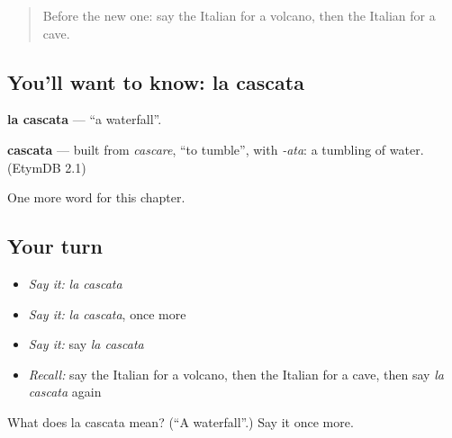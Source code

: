 \label{lesson:IT-C119-cascata}



\begin{quote}
Before the new one: say the Italian for a volcano, then the Italian for a cave.
\end{quote}

\subsection*{You'll want to know: la cascata}
\textbf{la cascata} — \textquotedblleft{}a waterfall\textquotedblright{}.

\begin{cousinweb}
\textbf{cascata} — built from \emph{cascare}, \textquotedblleft{}to tumble\textquotedblright{}, with \emph{-ata}: a tumbling of water. (EtymDB 2.1)
\end{cousinweb}

\begin{grammarlens}[title={What you've built}]
One more word for this chapter.
\end{grammarlens}

\subsection*{Your turn}
\begin{itemize}
\raggedright
  \item \emph{Say it:} \emph{la cascata}
  \item \emph{Say it:} \emph{la cascata}, once more
  \item \emph{Say it:} say \emph{la cascata}
  \item \emph{Recall:} say the Italian for a volcano, then the Italian for a cave, then say \emph{la cascata} again
\end{itemize}

\begin{tcolorbox}[breakable,colback=teal!4,colframe=teal!35!black,title={Before you move on}]
What does la cascata mean? (\textquotedblleft{}A waterfall\textquotedblright{}.) Say it once more.
\end{tcolorbox}
